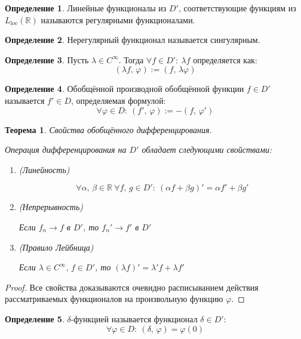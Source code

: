 \documentclass[a4paper,12pt]{article}
\renewcommand{\phi}{\ensuremath{\varphi}}
\theoremstyle{plain}
\newtheorem{theorem}{Теорема}[section]
\theoremstyle{definition}
\newtheorem{definition}{Определение}[section]
\theoremstyle{remark}
\begin{document}
\begin{definition}
	Линейные функционалы из $D'$, соответствующие функциям из $L_{\text{loc}}(\mathbb{R})$ называются регулярными функционалами.
\end{definition}

\begin{definition}
	Нерегулярный функционал называется сингулярным.
\end{definition}

\begin{definition}
	Пусть $\lambda \in C^\infty$. Тогда $\forall f \in D':\: \lambda f$ определяется как:
	\[(\lambda f,\, \phi) := (f,\, \lambda\phi)\]
\end{definition}

\begin{definition}
	Обобщённой производной обобщённой функции $f \in D'$ называется $f' \in D$, определяемая формулой:
	\[\forall \phi \in D:\: (f',\, \phi) := -(f,\, \phi')\]
\end{definition}

\begin{theorem}
	Свойства обобщённого дифференцирования.

	Операция дифференцирования на $D'$ обладает следующими свойствами:
	\begin{enumerate}
		\item (Линейность)
		
		\[\forall \alpha,\, \beta \in \mathbb{R} \: \forall f,\, g \in D':\: (\alpha f + \beta g)' = \alpha f' + \beta g'\]
		\item (Непрерывность)
		
		Если $f_n \to f$ в $D'$, то $f_n' \to f'$ в $D'$
		\item (Правило Лейбница)
		
		Если $\lambda \in C^\infty,\, f \in D'$, то $(\lambda f)' = \lambda' f + \lambda f'$
	\end{enumerate}
\end{theorem}

\begin{proof}
	Все свойства доказываются очевидно расписыванием действия рассматриваемых функционалов на произвольную функцию $\phi$.
\end{proof}

\begin{definition}
	$\delta$-функцией называется функционал $\delta \in D'$:
	\[\forall \phi \in D:\: (\delta,\, \phi) = \phi(0)\]
\end{definition}
\end{document}
